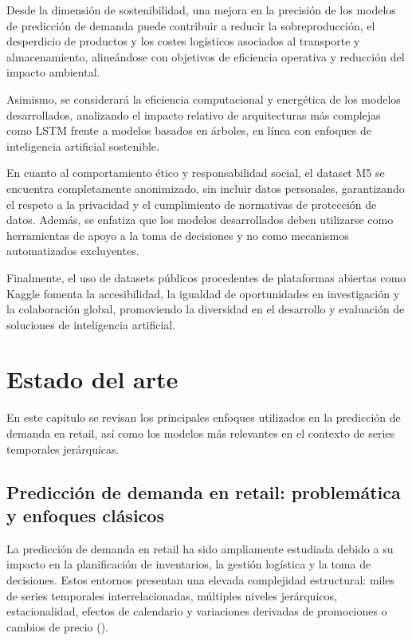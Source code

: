 \documentclass[IB,BIB]{TFUOC}%
\begin{document}
Desde la dimensión de sostenibilidad, una mejora en la precisión de los
modelos de predicción de demanda puede contribuir a reducir la
sobreproducción, el desperdicio de productos y los costes logísticos
asociados al transporte y almacenamiento, alineándose con objetivos de
eficiencia operativa y reducción del impacto ambiental.

Asimismo, se considerará la eficiencia computacional y energética de los
modelos desarrollados, analizando el impacto relativo de arquitecturas
más complejas como LSTM frente a modelos basados en árboles, en línea
con enfoques de inteligencia artificial sostenible.

En cuanto al comportamiento ético y responsabilidad social, el dataset
M5 se encuentra completamente anonimizado, sin incluir datos personales,
garantizando el respeto a la privacidad y el cumplimiento de normativas
de protección de datos. Además, se enfatiza que los modelos
desarrollados deben utilizarse como herramientas de apoyo a la toma de
decisiones y no como mecanismos automatizados excluyentes.

Finalmente, el uso de datasets públicos procedentes de plataformas
abiertas como Kaggle fomenta la accesibilidad, la igualdad de
oportunidades en investigación y la colaboración global, promoviendo la
diversidad en el desarrollo y evaluación de soluciones de inteligencia
artificial.

\newpage

\chapter{Estado del arte}

En este capítulo se revisan los principales enfoques utilizados en la
predicción de demanda en retail, así como los modelos más relevantes en
el contexto de series temporales jerárquicas.

\section{Predicción de demanda en retail: problemática y enfoques clásicos}

La predicción de demanda en retail ha sido ampliamente estudiada debido
a su impacto en la planificación de inventarios, la gestión logística y
la toma de decisiones. Estos entornos presentan una elevada complejidad
estructural: miles de series temporales interrelacionadas, múltiples
niveles jerárquicos, estacionalidad, efectos de calendario y variaciones
derivadas de promociones o cambios de precio (\cite{hyndman2021}).
\end{document}
